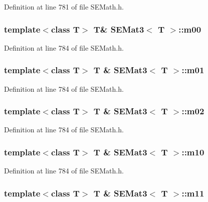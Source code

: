 Definition at line 781 of file S\+E\+Math.\+h.

\subsubsection[{m00}]{\setlength{\rightskip}{0pt plus 5cm}template$<$class T$>$ T\& {\bf S\+E\+Mat3}$<$ T $>$\+::m00}\label{class_s_e_mat3_acb95e8c56a4c84ad9c1b038e6315ebc9}


Definition at line 784 of file S\+E\+Math.\+h.

\subsubsection[{m01}]{\setlength{\rightskip}{0pt plus 5cm}template$<$class T$>$ T \& {\bf S\+E\+Mat3}$<$ T $>$\+::m01}\label{class_s_e_mat3_a46289da7eee7693478c861fe58d37253}


Definition at line 784 of file S\+E\+Math.\+h.

\subsubsection[{m02}]{\setlength{\rightskip}{0pt plus 5cm}template$<$class T$>$ T \& {\bf S\+E\+Mat3}$<$ T $>$\+::m02}\label{class_s_e_mat3_a08480b22bc1a2d907ce1aa57c3b48c05}


Definition at line 784 of file S\+E\+Math.\+h.

\subsubsection[{m10}]{\setlength{\rightskip}{0pt plus 5cm}template$<$class T$>$ T \& {\bf S\+E\+Mat3}$<$ T $>$\+::m10}\label{class_s_e_mat3_af08dfc1de04f82fb0de1aa1ac0230b44}


Definition at line 784 of file S\+E\+Math.\+h.

\subsubsection[{m11}]{\setlength{\rightskip}{0pt plus 5cm}template$<$class T$>$ T \& {\bf S\+E\+Mat3}$<$ T $>$\+::m11}\label{class_s_e_mat3_a5bad89d5a58743f1c135ad007bc40616}


